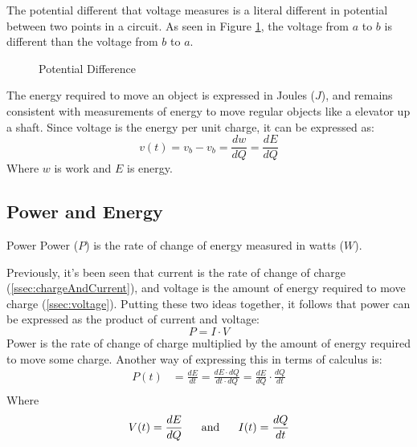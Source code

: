 \documentclass[12pt]{article}
\begin{document}
The potential different that voltage measures is a literal different in potential between two points in a circuit. As seen in Figure \ref{fig:potentialDifference}, the voltage from $a$ to $b$ is different than the voltage from $b$ to $a$.
\begin{figure}[H]
  \centering
  \begin{subfigure}[H]{0.45\textwidth}
    \centering
    
  \end{subfigure}
  \begin{subfigure}[H]{0.45\textwidth}
    \centering
    
  \end{subfigure}
  \caption{Potential Difference}
  \label{fig:potentialDifference}
\end{figure}
The energy required to move an object is expressed in Joules ($J$), and remains consistent with measurements of energy to move regular objects like a elevator up a shaft. Since voltage is the energy per unit charge, it can be expressed as:
\begin{equation*}
  v(t) = v_b - v_b = \frac{dw}{dQ} = \frac{dE}{dQ}
\end{equation*}
Where $w$ is work and $E$ is energy.

\subsection{Power and Energy}
\label{ssec:powerAndEnergy}

\begin{definition}{Power}
  Power ($P$) is the rate of change of energy measured in watts ($W$).
\end{definition}
Previously, it's been seen that current is the rate of change of charge (\ref{ssec:chargeAndCurrent}), and voltage is the amount of energy required to move charge (\ref{ssec:voltage}). Putting these two ideas together, it follows that power can be expressed as the product of current and voltage:
\begin{equation*}
  P = I \cdot V
\end{equation*}
Power is the rate of change of charge multiplied by the amount of energy required to move some charge. Another way of expressing this in terms of calculus is:
\begin{align*}
  P(t) &= \frac{dE}{dt} = \frac{dE \cdot dQ}{dt \cdot dQ} = \frac{dE}{dQ} \cdot \frac{dQ}{dt} \\
\end{align*}
Where
\begin{equation*}
  V(t) = \frac{dE}{dQ}\ \ \ \ \ \textup{and}\ \ \ \ \ I(t) = \frac{dQ}{dt}
\end{equation*}
\end{document}
